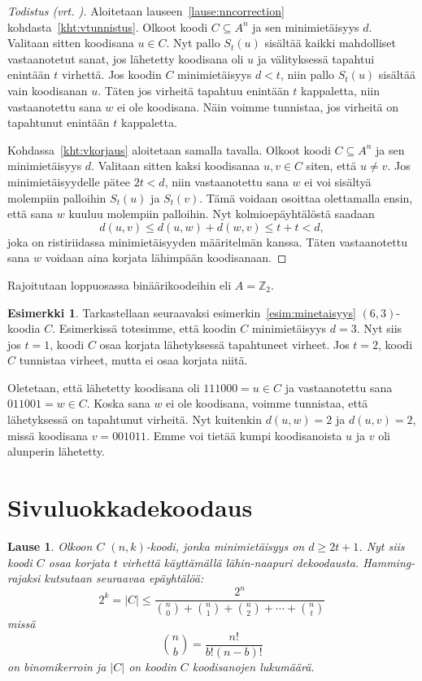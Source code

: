 \documentclass[a4paper,12pt,leqno,oneside]{report} %
\theoremstyle{plain}
\newtheorem{lause}{Lause}[chapter]
\theoremstyle{definition}
\newtheorem{esimerkki}{Esimerkki}[chapter]
\theoremstyle{remark}
\numberwithin{equation}{chapter}
\newcommand*{\Zset}{\mathbb{Z}}  %
\newcommand*{\abs}[1]{\left\lvert#1\right\rvert}   %
\begin{document}
    \begin{proof}[Todistus \upshape(vrt. {\cite[s.~494]{PA}})]\label{tod:nncorrection}
        Aloitetaan lauseen~\ref{lause:nncorrection} kohdasta~\ref{kht:vtunnistus}. Olkoot koodi $C \subseteq A^n$ ja sen minimietäisyys $d$. Valitaan sitten koodisana $u \in C$. Nyt pallo $S_t(u)$ sisältää kaikki mahdolliset vastaanotetut sanat, jos lähetetty koodisana oli $u$ ja välityksessä tapahtui enintään $t$ virhettä. Jos koodin $C$ minimietäisyys $d < t$, niin pallo $S_t(u)$ sisältää vain koodisanan $u$. Täten jos virheitä tapahtuu enintään $t$ kappaletta, niin vastaanotettu sana $w$ ei ole koodisana. Näin voimme tunnistaa, jos virheitä on tapahtunut enintään $t$ kappaletta.

        Kohdassa~\ref{kht:vkorjaus} aloitetaan samalla tavalla. Olkoot koodi $C \subseteq A^n$ ja sen minimietäisyys $d$. Valitaan sitten kaksi koodisanaa $u, v \in C$ siten, että $u \neq v$. Jos minimietäisyydelle pätee $2t < d$, niin vastaanotettu sana $w$ ei voi sisältyä molempiin palloihin $S_t(u)$ ja $S_t(v)$. Tämä voidaan osoittaa olettamalla ensin, että sana $w$ kuuluu molempiin palloihin. Nyt kolmioepäyhtälöstä saadaan
        \[
            d(u,v) \le d(u,w) + d(w, v) \le t + t < d,
        \]
        joka on ristiriidassa minimietäisyyden määritelmän kanssa. Täten vastaanotettu sana $w$ voidaan aina korjata lähimpään koodisanaan.
    \end{proof}

    Rajoitutaan loppuosassa binäärikoodeihin eli $A = \Zset_2$.
    \begin{esimerkki}
        Tarkastellaan seuraavaksi esimerkin~\ref{esim:minetaisyys} $(6,3)$-koodia $C$. Esimerkissä totesimme, että koodin $C$ minimietäisyys $d = 3$. Nyt siis jos $t = 1$, koodi $C$ osaa korjata lähetyksessä tapahtuneet virheet. Jos $t = 2$, koodi $C$ tunnistaa virheet, mutta ei osaa korjata niitä.

        Oletetaan, että lähetetty koodisana oli $111000 = u \in C$ ja vastaanotettu sana $011001= w \in C$. Koska sana $w$ ei ole koodisana, voimme tunnistaa, että lähetyksessä on tapahtunut virheitä. Nyt kuitenkin $d(u,w) = 2$ ja $d(u,v) = 2$, missä koodisana $v = 001011$. Emme voi tietää kumpi koodisanoista $u$ ja $v$ oli alunperin lähetetty.
    \end{esimerkki}

    \section{Sivuluokkadekoodaus}
    \begin{lause}\label{lause:Hammingraja}
        Olkoon $C$ $(n, k)$-koodi, jonka minimietäisyys on $d \ge 2t +1$. Nyt siis koodi $C$ osaa korjata $t$ virhettä käyttämällä lähin-naapuri dekoodausta. Hamming-rajaksi kutsutaan seuraavaa epäyhtälöä:
        \[
            2^k = \abs{C} \le \frac{2^n}{\binom{n}{0}+\binom{n}{1}+\binom{n}{2}+\cdots+\binom{n}{t}}
        \]
        missä
        \[
            \binom{n}{b} = \frac{n!}{b!(n-b)!}
        \]
        on binomikerroin ja $\abs{C}$ on koodin $C$ koodisanojen lukumäärä.
    \end{lause}
\end{document}
